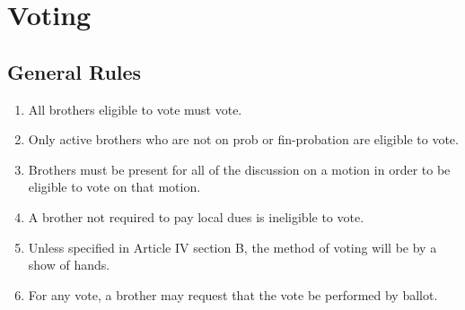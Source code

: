 
\chapter{Voting}

\section{General Rules}

	\begin{enumerate}
		\item All brothers eligible to vote must vote.

		\item Only active brothers who are not on \gls{prob} or \gls{fin-probation} are eligible to vote.

		\item Brothers must be present for all of the discussion on a motion in order to be eligible to vote on that motion.\label{voting-present} 

		\item A brother not required to pay local dues is ineligible to vote. %

		\item Unless specified in Article IV section B, the method of voting will be by a show of hands. 

		\item For any vote, a brother may request that the vote be performed by ballot.

	\end{enumerate}


